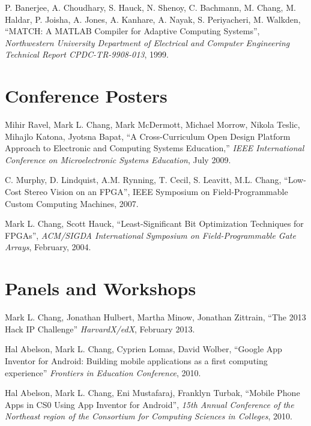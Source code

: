 \documentclass[line]{res}
\begin{document}
\begin{resume}
	P. Banerjee, A. Choudhary, S. Hauck, N. Shenoy, C. Bachmann, M. Chang, M. Haldar, P. Joisha, A. Jones, A. Kanhare, A. Nayak, S. Periyacheri, M. Walkden, ``MATCH: A MATLAB Compiler for Adaptive Computing Systems'', \emph{Northwestern University Department of Electrical and Computer Engineering Technical Report CPDC-TR-9908-013}, 1999.
	
	\section{\sc Conference Posters}
	
	Mihir Ravel, Mark L. Chang, Mark McDermott, Michael Morrow, Nikola Teslic, Mihajlo Katona, Jyotsna Bapat, ``A Cross-Curriculum Open Design Platform Approach to Electronic and Computing Systems Education,'' \emph{IEEE International Conference on Microelectronic Systems Education}, July 2009. 
	
	C. Murphy, D. Lindquist, A.M. Rynning, T. Cecil, S. Leavitt, M.L. Chang, ``Low-Cost Stereo Vision on an FPGA'', IEEE Symposium on Field-Programmable Custom Computing Machines, 2007.
	
	Mark L. Chang, Scott Hauck, ``Least-Significant Bit Optimization Techniques for FPGAs'', \emph{ACM/SIGDA International Symposium on Field-Programmable Gate Arrays}, February, 2004.
	
	\section{\sc Panels and Workshops}
	
	Mark L. Chang, Jonathan Hulbert, Martha Minow, Jonathan Zittrain, ``The 2013 Hack IP Challenge'' \textit{HarvardX/edX}, February 2013.

	Hal Abelson, Mark L. Chang, Cyprien Lomas, David Wolber, ``Google App Inventor for Android: Building mobile applications as a first computing experience'' \textit{Frontiers in Education Conference}, 2010.
	
	Hal Abelson, Mark L. Chang, Eni Mustafaraj, Franklyn Turbak, ``Mobile Phone Apps in CS0 Using App Inventor for Android'', \textit{15th Annual Conference of the Northeast region of the Consortium for Computing Sciences in Colleges}, 2010.
	

\end{resume}
\end{document}

